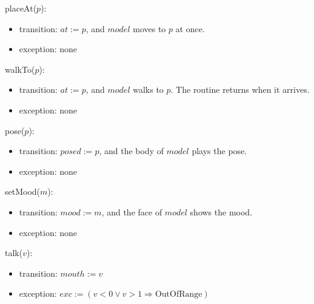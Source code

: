\documentclass[10pt, titlepage]{article}
\newcommand{\T}[1]{\mathit{#1}}          %
\newcommand{\exc}{\mathit{exc}}
\begin{document}
\begin{samepage}
\noindent placeAt($p$):
\begin{itemize}
\item transition: $\T{at} := p$, and $\T{model}$ moves to $p$ at once.
\item exception: none
\end{itemize}
\end{samepage}
\par\pagebreak[0]

\begin{samepage}
\noindent walkTo($p$):
\begin{itemize}
\item transition: $\T{at} := p$, and $\T{model}$ walks to $p$. The routine
  returns when it arrives.
\item exception: none
\end{itemize}
\end{samepage}
\par\pagebreak[0]

\begin{samepage}
\noindent pose($p$):
\begin{itemize}
\item transition: $\T{posed} := p$, and the body of $\T{model}$ plays the pose.
\item exception: none
\end{itemize}
\end{samepage}
\par\pagebreak[0]

\begin{samepage}
\noindent setMood($m$):
\begin{itemize}
\item transition: $\T{mood} := m$, and the face of $\T{model}$ shows the mood.
\item exception: none
\end{itemize}
\end{samepage}
\par\pagebreak[0]

\begin{samepage}
\noindent talk($v$):
\begin{itemize}
\item transition: $\T{mouth} := v$
\item exception: $\exc := (v < 0 \vee v > 1 \Rightarrow \text{OutOfRange})$
\end{itemize}
\end{samepage}
\par\pagebreak[0]
\end{document}
